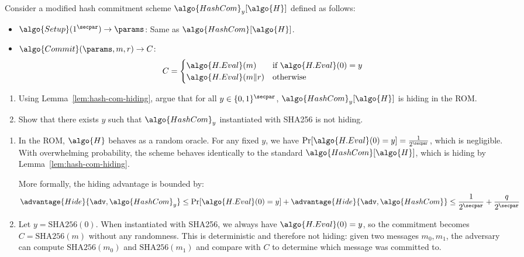 \begin{exercise}\label{ex:rom-contrived-hashcom}
  Consider a modified hash commitment scheme $\algo{HashCom}_y[\algo{H}]$ defined as follows:
  \begin{itemize}
    \item $\algo{Setup}(1^\secpar) \rightarrow \params$: Same as $\algo{HashCom}[\algo{H}]$.
    \item $\algo{Commit}(\params, m, r) \rightarrow C$: 
    \begin{align*}
      C = \begin{cases}
        \algo{H.Eval}(m) & \text{if } \algo{H.Eval}(0) = y \\
        \algo{H.Eval}(m \| r) & \text{otherwise}
      \end{cases}
    \end{align*}
  \end{itemize}
  
  \begin{enumerate}
    \item Using Lemma~\ref{lem:hash-com-hiding}, argue that for all $y \in \{0,1\}^\secpar$, $\algo{HashCom}_y[\algo{H}]$ is hiding in the ROM.
    \item Show that there exists $y$ such that $\algo{HashCom}_y$ instantiated with SHA256 is not hiding.
  \end{enumerate}
\end{exercise}

\ifsolutions
\begin{mysolution}
  \begin{enumerate}
    \item In the ROM, $\algo{H}$ behaves as a random oracle. For any fixed $y$, we have $\Pr[\algo{H.Eval}(0) = y] = \frac{1}{2^\secpar}$, which is negligible. With overwhelming probability, the scheme behaves identically to the standard $\algo{HashCom}[\algo{H}]$, which is hiding by Lemma~\ref{lem:hash-com-hiding}.
    
    More formally, the hiding advantage is bounded by:
    \[
    \advantage{Hide}{\adv, \algo{HashCom}_y} \leq \Pr[\algo{H.Eval}(0) = y] + \advantage{Hide}{\adv, \algo{HashCom}} \leq \frac{1}{2^\secpar} + \frac{q}{2^\secpar}
    \]
    
    \item Let $y = \text{SHA256}(0)$. When instantiated with SHA256, we always have $\algo{H.Eval}(0) = y$, so the commitment becomes $C = \text{SHA256}(m)$ without any randomness. This is deterministic and therefore not hiding: given two messages $m_0, m_1$, the adversary can compute $\text{SHA256}(m_0)$ and $\text{SHA256}(m_1)$ and compare with $C$ to determine which message was committed to.
  \end{enumerate}
\end{mysolution}
\fi

